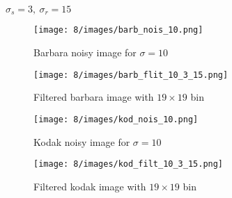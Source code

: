 \documentclass[12pt]{article}
\begin{document}
\begin{itemize}
    $\sigma_s = 3, \ \sigma_r = 15$
    \begin{figure}[H]
        \centering
        \begin{minipage}{.45\textwidth}
          \centering
          \texttt{[image: 8/images/barb\_nois\_10.png]}
          \caption*{Barbara noisy image for $\sigma = 10$}
          \label{fig:totalpowervst}
        \end{minipage}
        \begin{minipage}{.45\textwidth}
          \centering
          \texttt{[image: 8/images/barb\_flit\_10\_3\_15.png]}
          \caption*{Filtered barbara image with $19\times 19$ bin}
          \label{fig:totalpower2}
        \end{minipage}
        \label{fig:totalPower}
    \end{figure}
    
    \begin{figure}[H]
        \centering
        \begin{minipage}{.45\textwidth}
          \centering
          \texttt{[image: 8/images/kod\_nois\_10.png]}
          \caption*{Kodak noisy image for $\sigma = 10$}
          \label{fig:totalpowervst}
        \end{minipage}
        \begin{minipage}{.45\textwidth}
          \centering
          \texttt{[image: 8/images/kod\_filt\_10\_3\_15.png]}
          \caption*{Filtered kodak image with $19\times 19$ bin}
          \label{fig:totalpower2}
        \end{minipage}
        \label{fig:totalPower}
    \end{figure}
    
\end{itemize}
\end{document}
